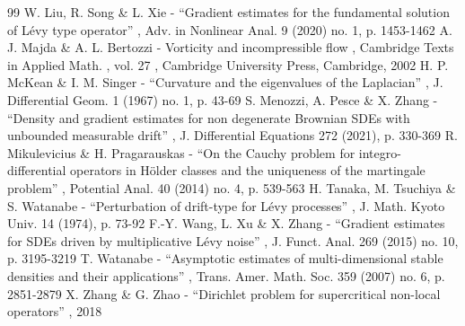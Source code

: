 \documentclass[11pt]{article}
\numberwithin{equation}{section}\providecommand{\asymp}{\mathrel{\sim}}
\theoremstyle{plain}
\theoremstyle{definition}
\newcommand\1{{\mathbf{1}}}
\begin{document}
\begin{thebibliography}{99}
 W. Liu, R. Song \& L. Xie - “Gradient estimates for the fundamental solution of Lévy type operator” , Adv. in Nonlinear Anal. 9 (2020) no. 1, p. 1453-1462
 A. J. Majda \& A. L. Bertozzi - Vorticity and incompressible flow , Cambridge Texts in Applied Math. , vol. 27 , Cambridge University Press, Cambridge, 2002
 H. P. McKean \& I. M. Singer - “Curvature and the eigenvalues of the Laplacian” , J. Differential Geom. 1 (1967) no. 1, p. 43-69
 S. Menozzi, A. Pesce \& X. Zhang - “Density and gradient estimates for non degenerate Brownian SDEs with unbounded measurable drift” , J. Differential Equations 272 (2021), p. 330-369
 R. Mikulevicius \& H. Pragarauskas - “On the Cauchy problem for integro-differential operators in Hölder classes and the uniqueness of the martingale problem” , Potential Anal. 40 (2014) no. 4, p. 539-563
 H. Tanaka, M. Tsuchiya \& S. Watanabe - “Perturbation of drift-type for Lévy processes” , J. Math. Kyoto Univ. 14 (1974), p. 73-92
 F.-Y. Wang, L. Xu \& X. Zhang - “Gradient estimates for SDEs driven by multiplicative Lévy noise” , J. Funct. Anal. 269 (2015) no. 10, p. 3195-3219
 T. Watanabe - “Asymptotic estimates of multi-dimensional stable densities and their applications” , Trans. Amer. Math. Soc. 359 (2007) no. 6, p. 2851-2879
 X. Zhang \& G. Zhao - “Dirichlet problem for supercritical non-local operators” , 2018
\end{thebibliography}
\end{document}
